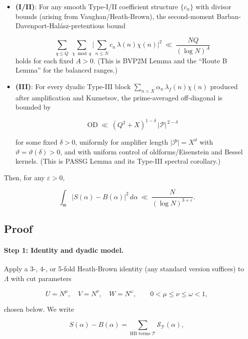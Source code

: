 \documentclass[11pt]{article}
\theoremstyle{definition}
\theoremstyle{remark}
\numberwithin{equation}{part}
\begin{document}
\begin{itemize}
	\item \textbf{(I/II)}: For any smooth Type-I/II coefficient structure $\{c_n\}$ with divisor bounds (arising from Vaughan/Heath-Brown), the second-moment Barban-Davenport-Halász-pretentious bound

	      \begin{equation}\label{eq:D1}
		      \sum_{q\le Q}\ \sum_{\chi\bmod q}\Big|\sum_{n\le N} c_n\,\lambda(n)\chi(n)\Big|^2
		      \ \ll\ \frac{NQ}{(\log N)^A}
	      \end{equation}
	      holds for each fixed $A>0$. (This is BVP2M Lemma and the “Route B Lemma” for the balanced ranges.)

	\item \textbf{(III)}: For every dyadic Type-III block $\sum_{n\asymp X}\alpha_n\,\lambda_f(n)\chi(n)$ produced after amplification and Kuznetsov, the prime-averaged off-diagonal is bounded by

	      \begin{equation}\label{eq:D2}\mathrm{OD}\ \ll\ (Q^2+X)^{1-\delta}\,|\mathcal P|^{\,2-\delta}\end{equation}

	      for some fixed $\delta>0$, uniformly for amplifier length $|\mathcal P|=X^\vartheta$ with $\vartheta=\vartheta(\delta)>0$, and with uniform control of oldforms/Eisenstein and Bessel kernels. (This is PASSG Lemma and its Type-III spectral corollary.)
\end{itemize}

Then, for any $\varepsilon>0$,

$$
	\int_{\mathfrak m}\big|S(\alpha)-B(\alpha)\big|^2\,d\alpha
	\ \ll\ \frac{N}{(\log N)^{3+\varepsilon}}.
$$

\subsection{Proof}

\paragraph{Step 1: Identity and dyadic model.}
Apply a 3-, 4-, or 5-fold Heath-Brown identity (any standard version suffices) to $\Lambda$ with cut parameters

$$
	U=N^{\mu},\quad V=N^{\nu},\quad W=N^{\omega},\qquad 0<\mu\le\nu\le\omega<1,
$$

chosen below. We write

$$
	S(\alpha)-B(\alpha)
	=\sum_{\text{HB terms }\mathcal T} \mathcal S_{\mathcal T}(\alpha),
$$
\end{document}
